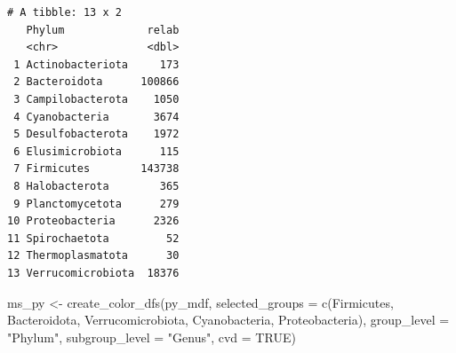 \documentclass[
  letterpaper,
  DIV=11,
  numbers=noendperiod]{scrartcl}
\newenvironment{Shaded}{\begin{snugshade}}{\end{snugshade}}
\newcommand{\AttributeTok}[1]{\textcolor[rgb]{0.40,0.45,0.13}{#1}}
\newcommand{\ConstantTok}[1]{\textcolor[rgb]{0.56,0.35,0.01}{#1}}
\newcommand{\FunctionTok}[1]{\textcolor[rgb]{0.28,0.35,0.67}{#1}}
\newcommand{\NormalTok}[1]{\textcolor[rgb]{0.00,0.23,0.31}{#1}}
\newcommand{\OtherTok}[1]{\textcolor[rgb]{0.00,0.23,0.31}{#1}}
\newcommand{\StringTok}[1]{\textcolor[rgb]{0.13,0.47,0.30}{#1}}
\begin{document}
\begin{verbatim}
# A tibble: 13 x 2
   Phylum             relab
   <chr>              <dbl>
 1 Actinobacteriota     173
 2 Bacteroidota      100866
 3 Campilobacterota    1050
 4 Cyanobacteria       3674
 5 Desulfobacterota    1972
 6 Elusimicrobiota      115
 7 Firmicutes        143738
 8 Halobacterota        365
 9 Planctomycetota      279
10 Proteobacteria      2326
11 Spirochaetota         52
12 Thermoplasmatota      30
13 Verrucomicrobiota  18376
\end{verbatim}

\begin{Shaded}
\begin{Highlighting}[]
\NormalTok{ms\_py }\OtherTok{\textless{}{-}} \FunctionTok{create\_color\_dfs}\NormalTok{(py\_mdf, }
                          \AttributeTok{selected\_groups =} \FunctionTok{c}\NormalTok{(}\StringTok{\textquotesingle{}Firmicutes\textquotesingle{}}\NormalTok{,}
                                              \StringTok{\textquotesingle{}Bacteroidota\textquotesingle{}}\NormalTok{,}
                                              \StringTok{\textquotesingle{}Verrucomicrobiota\textquotesingle{}}\NormalTok{,}
                                              \StringTok{\textquotesingle{}Cyanobacteria\textquotesingle{}}\NormalTok{,}
                                              \StringTok{\textquotesingle{}Proteobacteria\textquotesingle{}}\NormalTok{),}
                          \AttributeTok{group\_level =} \StringTok{"Phylum"}\NormalTok{, }
                          \AttributeTok{subgroup\_level =} \StringTok{"Genus"}\NormalTok{, }
                          \AttributeTok{cvd =} \ConstantTok{TRUE}\NormalTok{)}



\end{Highlighting}
\end{Shaded}
\end{document}
